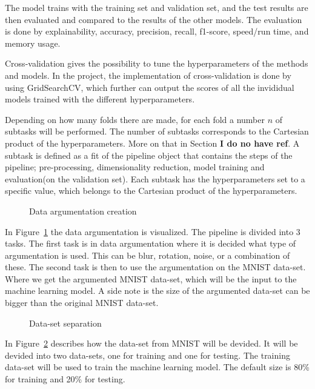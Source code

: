 The model trains with the training set and validation set, and the test results are then evaluated and compared to the results of the other models. The evaluation is done by explainability, accuracy, precision, recall, f1-score, speed/run time, and memory usage.


Cross-validation gives the possibility to tune the hyperparameters of the methods and models. In the project, the implementation of cross-validation is done by using GridSearchCV, which further can output the scores of all the invididual models trained with the different hyperparameters.


Depending on how many folds there are made, for each fold a number $n$ of subtasks will be performed. The number of subtasks corresponds to the Cartesian product of the hyperparameters. More on that in Section \textbf{I do no have ref}. A subtask is defined as a fit of the pipeline object that contains the steps of the pipeline; pre-processing, dimensionality reduction, model training and evaluation(on the validation set). Each subtask has the hyperparameters set to a specific value, which belongs to the Cartesian product of the hyperparameters.

\begin{figure}[htb!]
    \centering
    
    \caption{Data argumentation creation}
    \label{fig:data-argumentation-create}
\end{figure}

In Figure~\ref{fig:data-argumentation-create} the data argumentation is visualized. The pipeline is divided into 3 tasks. The first task is in data argumentation where it is decided what type of argumentation is used. This can be blur, rotation, noise, or a combination of these. The second task is then to use the argumentation on the MNIST data-set. Where we get the argumented MNIST data-set, which will be the input to the machine learning model. A side note is the size of the argumented data-set can be bigger than the original MNIST data-set.

\begin{figure}[htb!]
    \centering
    
    \caption{Data-set separation}
    \label{fig:data-set-sepa}
\end{figure}

In Figure~\ref{fig:data-set-sepa} describes how the data-set from MNIST will be devided. It will be devided into two data-sets, one for training and one for testing. The training data-set will be used to train the machine learning model. The default size is 80\% for training and 20\% for testing.